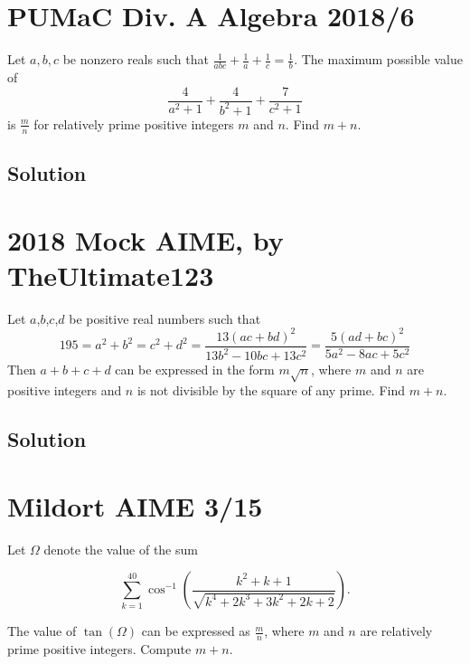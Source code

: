 \documentclass{article}
\begin{document}
\pagebreak\section{PUMaC Div. A Algebra 2018/6}
Let $a,b,c$ be nonzero reals such that $\frac{1}{abc}+\frac{1}{a}+\frac{1}{c}=\frac{1}{b}.$ The maximum possible value of $$\frac{4}{a^2+1}+\frac{4}{b^2+1}+\frac{7}{c^2+1}$$ is $\frac{m}{n}$ for relatively prime positive integers $m$ and $n.$ Find $m+n.$

\subsection{Solution}

\pagebreak\section{2018 Mock AIME, by TheUltimate123}
Let $a$,$b$,$c$,$d$ be positive real numbers such that \[195=a^2+b^2=c^2+d^2=\frac{13(ac+bd)^2}{13b^2-10bc+13c^2}=\frac{5(ad+bc)^2}{5a^2-8ac+5c^2}\] Then $a+b+c+d$ can be expressed in the form $m\sqrt{n}$, where $m$ and $n$ are positive integers and $n$ is not divisible by the square of any prime. Find $m+n$.

\subsection{Solution}

\pagebreak\section{Mildort AIME 3/15}
Let $\Omega$ denote the value of the sum

\[\sum\limits_{k=1}^{40} \cos^{-1}\left(\frac{k^2 + k + 1}{\sqrt{k^4 + 2k^3 + 3k^2 + 2k + 2}}\right).\]

The value of $\tan\left(\Omega\right)$ can be expressed as $\frac{m}{n}$, where $m$ and $n$ are relatively prime positive integers. Compute $m + n$.
\end{document}
